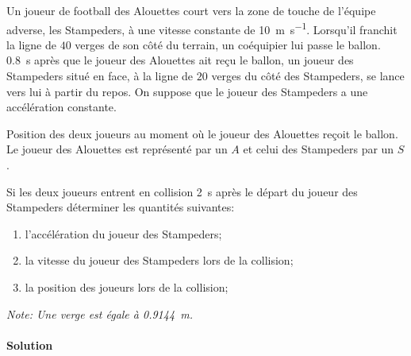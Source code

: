 Un joueur de football des Alouettes court vers la zone de touche de l'équipe
adverse, les Stampeders, à une vitesse constante de \SI{10}{\meter\per\second}.
Lorsqu'il franchit la ligne de $40$ verges de son côté du terrain, un
coéquipier lui passe le ballon.  \SI{0.8}{\second} après que le joueur des
Alouettes ait reçu le ballon, un joueur des Stampeders situé en face, à la
ligne de $20$ verges du côté des Stampeders, se lance vers lui à partir du
repos.  On suppose que le joueur des Stampeders a une accélération constante.

\begin{marginfigure}
  \caption{Position des deux joueurs au moment où le joueur des Alouettes
    reçoit le ballon.  Le joueur des Alouettes est représenté par un $A$ et
    celui des Stampeders par un $S$.}
  \label{fig:football}
\end{marginfigure}

Si les deux joueurs entrent en collision \SI{2}{\second} après le départ du
joueur des Stampeders déterminer les quantités suivantes:

\begin{enumerate}
  \item l'accélération du joueur des Stampeders;
  \item la vitesse du joueur des Stampeders lors de la collision;
  \item la position des joueurs lors de la collision;
\end{enumerate}

\textit{Note: Une verge est égale à \SI{0.9144}{\meter}.}

\paragraph{Solution}

